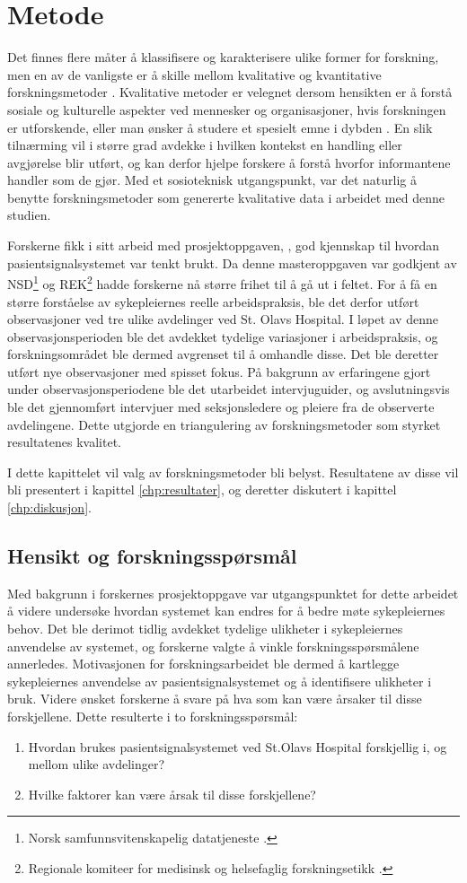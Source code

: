 \chapter{Metode}
\label{chp:metode} 

Det finnes flere måter å klassifisere og karakterisere ulike former for forskning, men en av de vanligste er å skille mellom kvalitative og kvantitative forskningsmetoder \citep{Myers13, Tjora}. Kvalitative metoder er velegnet dersom hensikten er å forstå sosiale og kulturelle aspekter ved mennesker og organisasjoner, hvis forskningen er utforskende, eller man ønsker å studere et spesielt emne i dybden \citep{Myers13}. En slik tilnærming vil i større grad avdekke i hvilken kontekst en handling eller avgjørelse blir utført, og kan derfor hjelpe forskere å forstå hvorfor informantene handler som de gjør. Med et sosioteknisk utgangspunkt, var det naturlig å benytte forskningsmetoder som genererte kvalitative data i arbeidet med denne studien.

\noindent
Forskerne fikk i sitt arbeid med prosjektoppgaven, \citep{Sund13}, god kjennskap til hvordan pasientsignalsystemet var tenkt brukt. Da denne masteroppgaven var godkjent av NSD\footnote{Norsk samfunnsvitenskapelig datatjeneste \citep{NSD}.} og REK\footnote{Regionale komiteer for medisinsk og helsefaglig forskningsetikk \citep{REK}.} hadde forskerne nå større frihet til å gå ut i feltet. For å få en større forståelse av sykepleiernes reelle arbeidspraksis, ble det derfor utført observasjoner ved tre ulike avdelinger ved St. Olavs Hospital. I løpet av denne observasjonsperioden ble det avdekket tydelige variasjoner i arbeidspraksis, og forskningsområdet ble dermed avgrenset til å omhandle disse. Det ble deretter utført nye observasjoner med spisset fokus. På bakgrunn av erfaringene gjort under observasjonsperiodene ble det utarbeidet intervjuguider, og avslutningsvis ble det gjennomført intervjuer med seksjonsledere og pleiere fra de observerte avdelingene. Dette utgjorde en triangulering av forskningsmetoder som styrket resultatenes kvalitet.

\noindent
I dette kapittelet vil valg av forskningsmetoder bli belyst. Resultatene av disse vil bli presentert i kapittel \ref{chp:resultater}, og deretter diskutert i kapittel \ref{chp:diskusjon}. 

\section{Hensikt og forskningsspørsmål}
Med bakgrunn i forskernes prosjektoppgave \citep{Sund13} var utgangspunktet for dette arbeidet å videre undersøke hvordan systemet kan endres for å bedre møte sykepleiernes behov. Det ble derimot tidlig avdekket tydelige ulikheter i sykepleiernes anvendelse av systemet, og forskerne valgte å vinkle forskningsspørsmålene annerledes. Motivasjonen for forskningsarbeidet ble dermed å kartlegge sykepleiernes anvendelse av pasientsignalsystemet og å identifisere ulikheter i bruk. Videre ønsket forskerne å svare på hva som kan være årsaker til disse forskjellene. Dette resulterte i to forskningsspørsmål:

\begin{enumerate}
\item Hvordan brukes pasientsignalsystemet ved St.Olavs Hospital forskjellig i, og mellom ulike avdelinger? 
\item Hvilke faktorer kan være årsak til disse forskjellene?
\end{enumerate}
